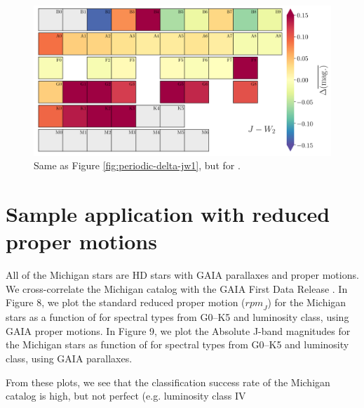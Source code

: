 \begin{figure}
    \centering
    \includegraphics[width=1.0\textwidth,clip=true]{Figures/periodic/periodic-delta_J_W2.png}
    \caption{Same as Figure \ref{fig:periodic-delta-jw1}, but for \jwtwo.}
    \label{fig:periodic-delta-jw2}
\end{figure}

\section{Sample application with reduced proper motions}

All of the Michigan stars are HD stars with GAIA parallaxes and proper motions.  We cross-correlate the Michigan catalog with the GAIA First Data Release \citep[]{gaia1,gaia2,Lindegren2016}.  In Figure 8, we plot the standard reduced proper motion (${rpm}_J$) for the Michigan stars as a function of \jwtwo for spectral types from G0--K5 and luminosity class, using GAIA proper motions.  In Figure 9, we plot the Absolute J-band magnitudes for the Michigan stars as function of \jwtwo for spectral types from G0--K5 and luminosity class, using GAIA parallaxes.

From these plots, we see that the classification success rate of the Michigan catalog is high, but not perfect (e.g. luminosity class IV 


